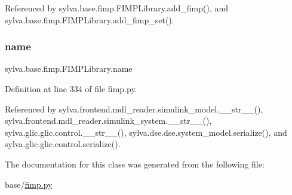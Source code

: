 Referenced by sylva.\+base.\+fimp.\+F\+I\+M\+P\+Library.\+add\+\_\+fimp(), and sylva.\+base.\+fimp.\+F\+I\+M\+P\+Library.\+add\+\_\+fimp\+\_\+set().

\mbox{\label{classsylva_1_1base_1_1fimp_1_1_f_i_m_p_library_a2799e2d0e2b692134faa3818a970247b}} 
\subsubsection{\texorpdfstring{name}{name}}
{\footnotesize\ttfamily sylva.\+base.\+fimp.\+F\+I\+M\+P\+Library.\+name}



Definition at line 334 of file fimp.\+py.



Referenced by sylva.\+frontend.\+mdl\+\_\+reader.\+simulink\+\_\+model.\+\_\+\+\_\+str\+\_\+\+\_\+(), sylva.\+frontend.\+mdl\+\_\+reader.\+simulink\+\_\+system.\+\_\+\+\_\+str\+\_\+\+\_\+(), sylva.\+glic.\+glic.\+control.\+\_\+\+\_\+str\+\_\+\+\_\+(), sylva.\+dse.\+dse.\+system\+\_\+model.\+serialize(), and sylva.\+glic.\+glic.\+control.\+serialize().



The documentation for this class was generated from the following file\+:\begin{DoxyCompactItemize}
\item 
base/\hyperlink{fimp_8py}{fimp.\+py}\end{DoxyCompactItemize}

